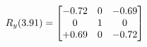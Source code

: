\documentclass[preview]{standalone}
\begin{document}
\begin{align*}
\special{dvisvgm:raw <g id='unique000'>}R_{y}(3.91) = \begin{bmatrix}-0.72 & 0 & -0.69 \\0 & 1 & 0 \\+0.69 & 0 & -0.72\end{bmatrix}\special{dvisvgm:raw </g>}
\end{align*}
\end{document}
